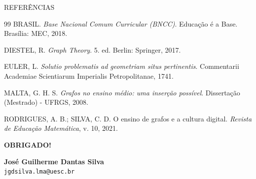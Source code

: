 \documentclass[10pt, aspectratio=169]{beamer}
\begin{document}
\begin{frame}{REFERÊNCIAS}
  \vspace{0.2cm}
  \begin{thebibliography}{99}
    \small
     BRASIL. \emph{Base Nacional Comum Curricular (BNCC)}. Educação é a Base. Brasília: MEC, 2018.
    
     DIESTEL, R. \emph{Graph Theory}. 5. ed. Berlin: Springer, 2017.
    
     EULER, L. \emph{Solutio problematis ad geometriam situs pertinentis}. Commentarii Academiae Scientiarum Imperialis Petropolitanae, 1741.
    
     MALTA, G. H. S. \emph{Grafos no ensino médio: uma inserção possível}. Dissertação (Mestrado) - UFRGS, 2008.
    
     RODRIGUES, A. B.; SILVA, C. D. O ensino de grafos e a cultura digital. \emph{Revista de Educação Matemática}, v. 10, 2021.
  \end{thebibliography}
\end{frame}

\begin{frame}[plain]
  \vfill
  \begin{center}
    \Huge \textbf{\textcolor{uescgreen}{OBRIGADO!}}
    
    \vspace{0.8cm}
    \large \textbf{José Guilherme Dantas Silva} \\
    \normalsize \texttt{jgdsilva.lma@uesc.br}
  \end{center}
  \vfill
\end{frame}
\end{document}
